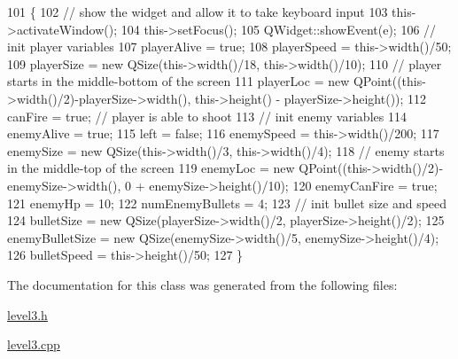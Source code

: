 \begin{DoxyCode}
101 \{
102     \textcolor{comment}{// show the widget and allow it to take keyboard input}
103     this->activateWindow();
104     this->setFocus();
105     QWidget::showEvent(e);
106     \textcolor{comment}{// init player variables}
107     playerAlive = \textcolor{keyword}{true};
108     playerSpeed = this->width()/50;
109     playerSize = \textcolor{keyword}{new} QSize(this->width()/18, this->width()/10);
110     \textcolor{comment}{// player starts in the middle-bottom of the screen}
111     playerLoc = \textcolor{keyword}{new} QPoint((this->width()/2)-playerSize->width(), this->height() - playerSize->height());
112     canFire = \textcolor{keyword}{true}; \textcolor{comment}{// player is able to shoot}
113     \textcolor{comment}{// init enemy variables}
114     enemyAlive = \textcolor{keyword}{true};
115     left = \textcolor{keyword}{false};
116     enemySpeed = this->width()/200;
117     enemySize = \textcolor{keyword}{new} QSize(this->width()/3, this->width()/4);
118     \textcolor{comment}{// enemy starts in the middle-top of the screen}
119     enemyLoc = \textcolor{keyword}{new} QPoint((this->width()/2)-enemySize->width(), 0 + enemySize->height()/10);
120     enemyCanFire = \textcolor{keyword}{true};
121     enemyHp = 10;
122     numEnemyBullets = 4;
123     \textcolor{comment}{// init bullet size and speed}
124     bulletSize = \textcolor{keyword}{new} QSize(playerSize->width()/2, playerSize->height()/2);
125     enemyBulletSize = \textcolor{keyword}{new} QSize(enemySize->width()/5, enemySize->height()/4);
126     bulletSpeed = this->height()/50;
127 \}
\end{DoxyCode}


The documentation for this class was generated from the following files\+:\begin{DoxyCompactItemize}
\item 
\hyperlink{level3_8h}{level3.\+h}\item 
\hyperlink{level3_8cpp}{level3.\+cpp}\end{DoxyCompactItemize}
